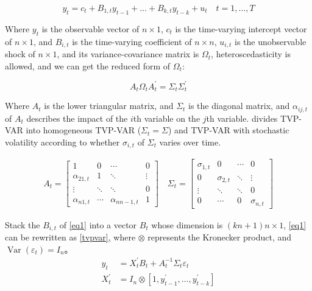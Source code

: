\documentclass[11pt]{article}
\begin{document}
\begin{equation}
	y_{t}=c_{t}+B_{1, t} y_{t-1}+\ldots+B_{k, t} y_{t-k}+u_{t} \quad t=1, \ldots, T \label{eq1}
\end{equation}

Where $y_t$ is the observable vector of $n \times 1$, $c_t$ is the time-varying intercept vector of $n \times 1$, 
and $B_{i,t}$ is the time-varying coefficient of $n \times n$, $u_{i,t}$ is the unobservable shock of $n \times 1$, 
and its variance-covariance matrix is $ \Omega_{t} $, heteroscedasticity is allowed, 
and we can get the reduced form of $ \Omega_{t} $:

\begin{equation}
	A_{t}\Omega_{t}A_{t}^{\prime}  = \Sigma_{t} \Sigma_{t}^{\prime}
\end{equation}

Where $A_t$ is the lower triangular matrix, and $\Sigma_{t} $ is the diagonal matrix, and
$\alpha_{ij, t}$ of $A_t$ describes the impact of the $i$th variable on the $j$th variable. 
\cite{koop2010bayesian} divides TVP-VAR into homogeneous TVP-VAR ($ \Sigma_{t} = \Sigma $) and
 TVP-VAR with stochastic volatility according to whether $\sigma_{i, t}$ of $\Sigma_{t}$ varies over time.

$$
\begin{array}{c}
	A_{t}=\left[\begin{array}{cccc}
	1 & 0 & \cdots & 0 \\
	\alpha_{21, t} & 1 & \ddots & \vdots \\
	\vdots & \ddots & \ddots & 0 \\
	\alpha_{n 1, t} & \cdots & \alpha_{n n-1, t} & 1
	\end{array}\right] \quad
	\Sigma_{t}=\left[\begin{array}{cccc}
	\sigma_{1, t} & 0 & \cdots & 0 \\
	0 & \sigma_{2, t} & \ddots & \vdots \\
	\vdots & \ddots & \ddots & 0 \\
	0 & \cdots & 0 & \sigma_{n, t}
	\end{array}\right]
	\end{array} $$



Stack the $B_{i,t}$ of \eqref{eq1} into a vector $B_{t}$ whose dimension is $(kn+1)n \times 1$, 
\eqref{eq1} can be rewritten as \eqref{tvpvar}, where $\otimes$ represents the Kronecker product,
and $\operatorname{Var}(\varepsilon_{t}) = I_{n}$。
\begin{equation}
	\begin{aligned}
		y_{t} &=X_{t}^{\prime} B_{t}+A_{t}^{-1} \Sigma_{t} \varepsilon_{t} \\
		X_{t}^{\prime} &=I_{n} \otimes\left[1, y_{t-1}^{\prime}, \ldots, y_{t-k}^{\prime}\right]
	\end{aligned}
	\label{tvpvar}
\end{equation}
\end{document}
